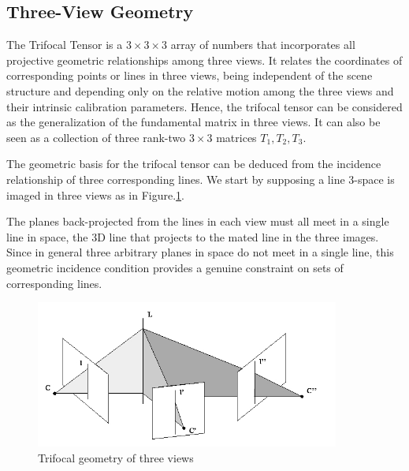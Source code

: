 \subsection{Three-View Geometry}
The Trifocal Tensor is a $3 \times 3 \times 3$ array of numbers that incorporates all projective geometric relationships among three views. It relates the coordinates of corresponding points or lines in three views, being independent of the scene structure and depending only on the relative motion among the three views and their intrinsic calibration parameters. Hence, the trifocal tensor can be considered as the generalization of the fundamental matrix in three views. It can also be seen as a collection of three rank-two $3 \times 3$ matrices $T_1, T_2, T_3$.

The geometric basis for the trifocal tensor can be deduced from the incidence relationship of three corresponding lines. We start by supposing a line 3-space is imaged in three views as in Figure.\ref{fig:threeviews}.

The planes back-projected from the lines in each view must all meet in a single line in space, the 3D line that projects to the mated line in the three images. Since in general three arbitrary planes in space do not meet in a single line, this geometric incidence condition provides a genuine constraint on sets of corresponding lines.

\begin{figure}[ht!]
  \centering
  \includegraphics[width=100mm]{figures/threeviews.jpg}
  \caption{Trifocal geometry of three views}
  \label{fig:threeviews}
\end{figure}

